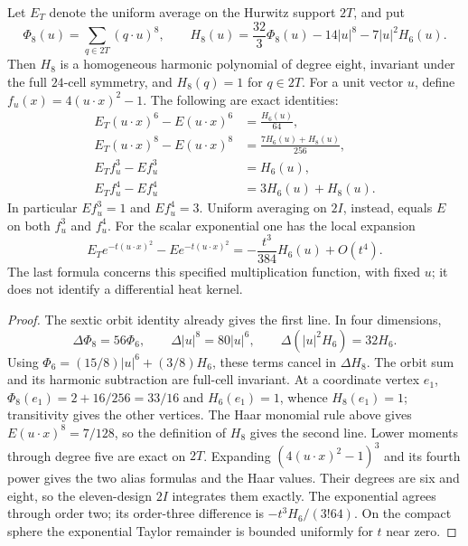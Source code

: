 \documentclass[11pt]{article}
\begin{document}
\begin{proposition}
\label{p1:prop:v215-eight-alias}
Let \(E_T\) denote the uniform average on the Hurwitz support \(2T\),
and put
\[
 \Phi_8(u)=\sum_{q\in2T}(q\cdot u)^8,\qquad
 H_8(u)=\frac{32}{3}\Phi_8(u)-14|u|^8-7|u|^2H_6(u).
\]
Then \(H_8\) is a homogeneous harmonic polynomial of degree eight,
invariant under the full \(24\)-cell symmetry, and \(H_8(q)=1\) for
\(q\in2T\). For a unit vector \(u\), define
\(f_u(x)=4(u\cdot x)^2-1\). The following are exact identities:
\[
 \begin{split}
 E_T(u\cdot x)^6-E(u\cdot x)^6&=\frac{H_6(u)}{64},\\
 E_T(u\cdot x)^8-E(u\cdot x)^8
                         &=\frac{7H_6(u)+H_8(u)}{256},\\
 E_T f_u^3-E f_u^3&=H_6(u),\\
 E_T f_u^4-E f_u^4&=3H_6(u)+H_8(u).
 \end{split}
\]
In particular \(Ef_u^3=1\) and \(Ef_u^4=3\). Uniform averaging on
\(2I\), instead, equals \(E\) on both \(f_u^3\) and \(f_u^4\).
For the scalar exponential one has the local expansion
\[
 E_Te^{-t(u\cdot x)^2}-Ee^{-t(u\cdot x)^2}
                  =-\frac{t^3}{384}H_6(u)+O(t^4).
\]
The last formula concerns this specified multiplication function, with
fixed \(u\); it does not identify a differential heat kernel.
\end{proposition}
\begin{proof}
The sextic orbit identity already gives the first line. In four
dimensions,
\[
 \Delta\Phi_8=56\Phi_6,\qquad
 \Delta|u|^8=80|u|^6,\qquad
 \Delta(|u|^2H_6)=32H_6.
\]
Using \(\Phi_6=(15/8)|u|^6+(3/8)H_6\), these terms cancel in
\(\Delta H_8\). The orbit sum and its harmonic subtraction are
full-cell invariant. At a coordinate vertex \(e_1\),
\(\Phi_8(e_1)=2+16/256=33/16\) and \(H_6(e_1)=1\), whence
\(H_8(e_1)=1\); transitivity gives the other vertices. The Haar
monomial rule above gives \(E(u\cdot x)^8=7/128\), so the
definition of \(H_8\) gives the second line. Lower moments through
degree five are exact on \(2T\). Expanding
\((4(u\cdot x)^2-1)^3\) and its fourth power gives the two alias
formulas and the Haar values. Their degrees are six and eight, so the
eleven-design \(2I\) integrates them exactly. The exponential agrees
through order two; its order-three difference is
\(-t^3H_6/(3!64)\). On the compact sphere the exponential Taylor
remainder is bounded uniformly for \(t\) near zero.
\end{proof}
\end{document}

